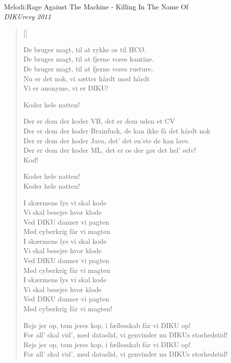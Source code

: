 {Melodi:Rage Against The Machine - Killing In The Name Of}\\[.2em]
{\small\itshape DIKUrevy 2011}
\begin{multicols}{2}
\settowidth{\versewidth}{De bruger magt, til at fjerne vores kantine.}
\begin{verse}[\versewidth]

De bruger magt, til at rykke os til HCØ.\\
De bruger magt, til at fjerne vores kantine.\\
De bruger magt, til at fjerne vores rusture.\\
Nu er det nok, vi sætter hårdt mod hårdt\\
Vi er anonyme, vi er DIKU!

Koder hele natten!

Der er dem der koder VB, det er dem uden et CV\\
Der er dem der koder Brainfuck, de kan ikke få det hårdt nok\\
Der er dem der koder Java, det' det en'ste de kan lave.\\
Der er dem der koder ML, det er os der gør det hel' selv!\\
Kod!

Koder hele natten!\\
Koder hele natten!

I skærmens lys vi skal kode\\
Vi skal besejre hvor klode\\
Ved DIKU danner vi pagten\\
Med cyberkrig får vi magten\\
I skærmens lys vi skal kode\\
Vi skal besejre hvor klode\\
Ved DIKU danner vi pagten\\
Med cyberkrig får vi magten\\
I skærmens lys vi skal kode\\
Vi skal besejre hvor klode\\
Ved DIKU danner vi pagten\\
Med cyberkrig får vi magten!

Rejs jer op, tøm jeres kop, i fællesskab får vi DIKU op!\\
For all' skal vid', med dataslid, vi genvinder nu DIKUs storhedstid!\\
Rejs jer op, tøm jeres kop, i fællesskab får vi DIKU op!\\
For all' skal vid', med dataslid, vi genvinder nu DIKUs storhedstid!


\end{verse}
\end{multicols}
